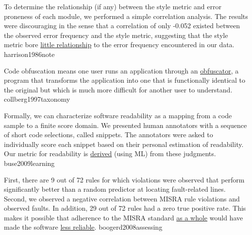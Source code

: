 \documentclass{article}
\begin{document}

  {To determine the relationship (if any) between the style metric and error proneness of each module, we performed a simple correlation analysis. The results were discouraging in the sense that a correlation of only -0.052 existed between the observed error frequency and the style metric, suggesting that the style metric bore \ul{little relationship} to the error frequency encountered in our data.}
  {harrison1986note}

  {Code obfuscation means one user runs an application through an \ul{obfuscator}, a program that transforms the application into one that is functionally identical to the original but which is much more difficult for another user to understand.}
  {collberg1997taxonomy}

  {Formally, we can characterize software readability as a mapping from a code sample to a finite score domain. We presented human annotators with a sequence of short code selections, called snippets. The annotators were asked to individually score each snippet based on their personal estimation of readability. Our metric for readability is \ul{derived} (using ML) from these judgments.}
  {buse2009learning}

  {First, there are 9 out of 72 rules for which violations were observed that perform significantly better than a random predictor at locating fault-related lines. Second, we observed a negative correlation between MISRA rule violations and observed faults. In addition, 29 out of 72 rules had a zero true positive rate. This makes it possible that adherence to the MISRA standard \ul{as a whole} would have made the software \ul{less reliable}.}
  {boogerd2008assessing}

\end{document}
